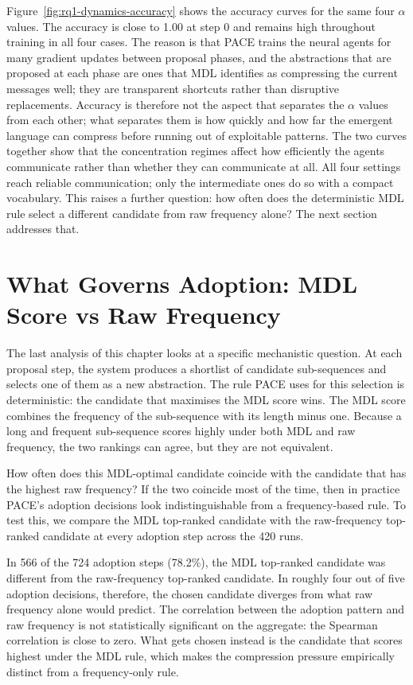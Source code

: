 Figure~\ref{fig:rq1-dynamics-accuracy} shows the accuracy curves for the same four $\alpha$ values. The accuracy is close to 1.00 at step 0 and remains high throughout training in all four cases. The reason is that PACE trains the neural agents for many gradient updates between proposal phases, and the abstractions that are proposed at each phase are ones that MDL identifies as compressing the current messages well; they are transparent shortcuts rather than disruptive replacements. Accuracy is therefore not the aspect that separates the $\alpha$ values from each other; what separates them is how quickly and how far the emergent language can compress before running out of exploitable patterns. The two curves together show that the concentration regimes affect how efficiently the agents communicate rather than whether they can communicate at all. All four settings reach reliable communication; only the intermediate ones do so with a compact vocabulary. This raises a further question: how often does the deterministic MDL rule select a different candidate from raw frequency alone? The next section addresses that.

\section{What Governs Adoption: MDL Score vs Raw Frequency}
\label{sec:rq1-mdl-vs-frequency}

The last analysis of this chapter looks at a specific mechanistic question. At each proposal step, the system produces a shortlist of candidate sub-sequences and selects one of them as a new abstraction. The rule PACE uses for this selection is deterministic: the candidate that maximises the MDL score wins. The MDL score combines the frequency of the sub-sequence with its length minus one. Because a long and frequent sub-sequence scores highly under both MDL and raw frequency, the two rankings can agree, but they are not equivalent.

How often does this MDL-optimal candidate coincide with the candidate that has the highest raw frequency? If the two coincide most of the time, then in practice PACE's adoption decisions look indistinguishable from a frequency-based rule. To test this, we compare the MDL top-ranked candidate with the raw-frequency top-ranked candidate at every adoption step across the 420 runs.

In 566 of the 724 adoption steps (78.2\%), the MDL top-ranked candidate was different from the raw-frequency top-ranked candidate. In roughly four out of five adoption decisions, therefore, the chosen candidate diverges from what raw frequency alone would predict. The correlation between the adoption pattern and raw frequency is not statistically significant on the aggregate: the Spearman correlation is close to zero. What gets chosen instead is the candidate that scores highest under the MDL rule, which makes the compression pressure empirically distinct from a frequency-only rule.

